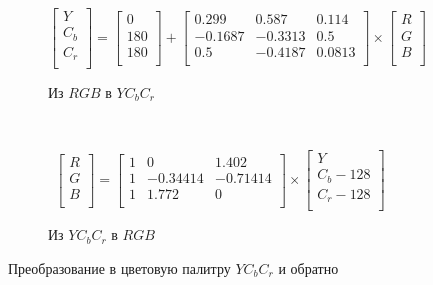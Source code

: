 \documentclass[a4paper,12pt]{article}
\numberwithin{equation}{section}
\begin{document}
\begin{figure}
  \centering
  \begin{subfigure}[b]{\textwidth}
    \[
    \begin{bmatrix}
      Y \\
      C_b \\
      C_r \\
    \end{bmatrix}
    =
    \begin{bmatrix}
      0 \\
      180 \\
      180 \\
    \end{bmatrix}
    +
    \begin{bmatrix}
      0.299 & 0.587 & 0.114 \\
      -0.1687 & -0.3313 & 0.5 \\
      0.5 & -0.4187 & 0.0813 \\
    \end{bmatrix}
    \times
    \begin{bmatrix}
      R \\
      G \\
      B \\
    \end{bmatrix}
    \]
    \caption{Из $RGB$ в $YC_bC_r$}
  \end{subfigure} \\
  \begin{subfigure}[b]{\textwidth}
    \[
    \begin{bmatrix}
      R \\
      G \\
      B \\
    \end{bmatrix}
    =
    \begin{bmatrix}
      1 & 0 & 1.402 \\
      1 & -0.34414 & -0.71414 \\
      1 & 1.772 & 0 \\
    \end{bmatrix}
    \times
    \begin{bmatrix}
      Y \\
      C_b - 128 \\
      C_r - 128 \\
    \end{bmatrix}
    \]
    \caption{Из $YC_bC_r$ в $RGB$}
  \end{subfigure}
  
  \caption{Преобразование в цветовую палитру $YC_bC_r$ и обратно}
  \label{tab:yuv}
\end{figure}
\end{document}
